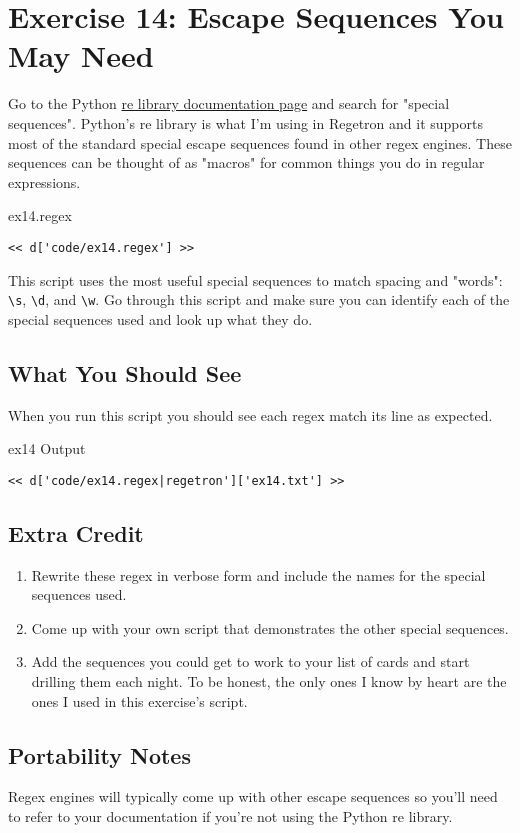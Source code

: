 \chapter{Exercise 14: Escape Sequences You May Need}

Go to the Python \href{http://docs.python.org/library/re.html}{re library documentation page} and search for "special sequences".  Python's re library is what I'm
using in Regetron and it supports most of the standard special escape sequences 
found in other regex engines.  These sequences can be thought of as "macros"
for common things you do in regular expressions.

\begin{code}{ex14.regex}
\begin{Verbatim}
<< d['code/ex14.regex'] >>
\end{Verbatim}
\end{code}

This script uses the most useful special sequences to match spacing and
"words": \verb|\s|, \verb|\d|, and \verb|\w|.  Go through this script and make
sure you can identify each of the special sequences used and look up 
what they do.

\section{What You Should See}

When you run this script you should see each regex match its line as
expected.

\begin{code}{ex14 Output}
\begin{Verbatim}
<< d['code/ex14.regex|regetron']['ex14.txt'] >>
\end{Verbatim}
\end{code}


\section{Extra Credit}

\begin{enumerate}
\item Rewrite these regex in verbose form and include the names for the special
    sequences used.
\item Come up with your own script that demonstrates the other special sequences.
\item Add the sequences you could get to work to your list of cards and start
    drilling them each night.  To be honest, the only ones I know by heart are
    the ones I used in this exercise's script.
\end{enumerate}

\section{Portability Notes}

Regex engines will typically come up with other escape sequences so you'll
need to refer to your documentation if you're not using the Python re library.
